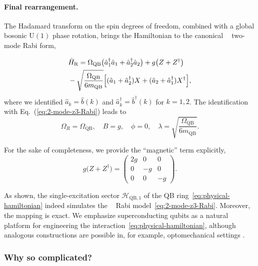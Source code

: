 \documentclass[reprint, aps, prx, amsmath, amssymb, longbibliography, superscriptaddress]{revtex4-2}
\DeclareMathOperator{\Zthree}{\mathbb{Z}_3}
\begin{document}
\paragraph{Final rearrangement.}
The Hadamard transform on the spin degrees of freedom, combined with a global
bosonic $\mathrm{U(1)}$ phase rotation, brings the Hamiltonian to the canonical
$\Zthree$ two-mode Rabi form,

\begin{align}
\label{eq:effective-rabi}
    &\hat H_{\text{R}} = \Omega_{\text{QB}}
      \bigl( \hat a^{\dagger}_1 \hat a_1 + \hat a^{\dagger}_2 \hat a_2 \bigr)
      + g \bigl( Z + Z^{\dagger} \bigr) \notag
      \\
      &- \sqrt{ \frac{\Omega_{\text{QB}}}{6 m_{\text{QB}}} }
      \Bigl[ ( \hat a_1 + \hat a^{\dagger}_2 ) X
        + ( \hat a_2 + \hat a^{\dagger}_1 ) X^{\dagger} \Bigr],
\end{align}
where we identified $\hat a_k = \hat b(k)$ and $\hat a_k^{\dagger} = \hat b^{\dagger}(k)$ for $k = 1,2$. The identification with Eq.~(\ref{eq:2-mode-z3-Rabi}) leads to
\begin{equation}
\label{eq:QB-RM-parameter-mapping}
  \Omega_R = \Omega_{\text{QB}},
  \quad B = g,
  \quad \phi = 0,
  \quad \lambda = \sqrt{ \frac{\Omega_{\text{QB}}}{6 m_{\text{QB}}} }.
\end{equation}

For the sake of completeness, we provide the ``magnetic'' term explicitly,
\begin{equation}
\label{eq:superconducting-magnetic-term}
  g \bigl( Z + Z^{\dagger} \bigr) =
  \begin{pmatrix}
    2 g & 0 & 0 \\
    0 & -g & 0 \\
    0 & 0 & -g
  \end{pmatrix}.
\end{equation}

As shown, the single-excitation sector $\mathcal{H}_{\text{QB},1}$ of the QB ring~\eqref{eq:physical-hamiltonian} indeed simulates the $\Zthree$ Rabi model~\eqref{eq:2-mode-z3-Rabi}. Moreover, the mapping is exact. We emphasize superconducting qubits as a natural platform for engineering the
interaction~\eqref{eq:physical-hamiltonian}, although analogous constructions are
possible in, for example, optomechanical settings \cite{sedov_chiral_2020}.


\subsubsection{Why so complicated?}
\end{document}
